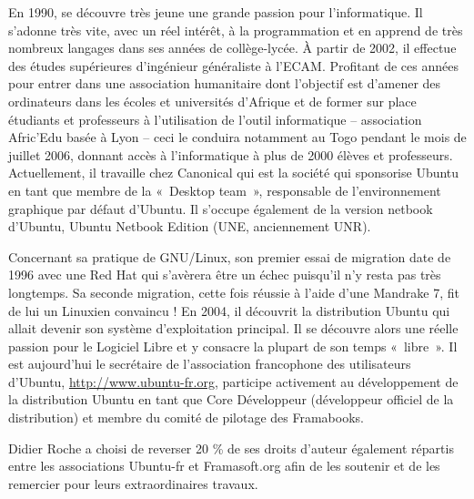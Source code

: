 En 1990,  se découvre très jeune une grande passion pour l'informatique. Il s'adonne très vite, avec un réel intérêt, à la programmation et en apprend de très nombreux langages dans ses années de collège-lycée. À partir de 2002, il effectue des études supérieures d'ingénieur généraliste à l'ECAM. Profitant de ces années pour entrer dans une association humanitaire dont l'objectif est d'amener des ordinateurs dans les écoles et universités d'Afrique et de former sur place étudiants et professeurs à l'utilisation de l'outil informatique -- association Afric'Edu basée à Lyon -- ceci le conduira notamment au Togo pendant le mois de juillet 2006, donnant accès à l'informatique à plus de 2000 élèves et professeurs. Actuellement, il travaille chez Canonical qui est la société qui sponsorise Ubuntu en tant que membre de la «~Desktop team~», responsable de l'environnement graphique par défaut d'Ubuntu. Il s'occupe également de la version netbook d'Ubuntu, Ubuntu Netbook Edition (UNE, anciennement UNR).\par
Concernant sa pratique de GNU/Linux, son premier essai de migration date de 1996 avec une Red Hat qui s'avèrera être un échec puisqu'il n'y resta pas très longtemps. Sa seconde migration, cette fois réussie à l'aide d'une Mandrake 7, fit de lui un Linuxien convaincu ! En 2004, il découvrit la distribution Ubuntu qui allait devenir son système d'exploitation principal. Il se découvre alors une réelle passion pour le Logiciel Libre et y consacre la plupart de son temps «~libre~». Il est aujourd'hui le secrétaire de l'association francophone des utilisateurs d'Ubuntu, \url{http://www.ubuntu-fr.org}, participe activement au développement de la distribution Ubuntu en tant que Core Développeur (développeur officiel de la distribution) et membre du comité de pilotage des Framabooks.\par
Didier Roche a choisi de reverser 20 \% de ses droits d'auteur également répartis entre les associations Ubuntu-fr et Framasoft.org afin de les soutenir et de les remercier pour leurs extraordinaires travaux.\par
